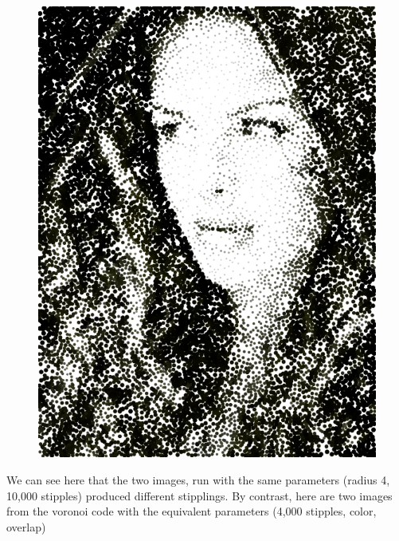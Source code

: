 \documentclass[11pt]{article}
\begin{document}
\begin{figure}[H]
\includegraphics[scale=0.4]{fairyeyes-10000-r4-2.png}
\end{figure}

We can see here that the two images, run with the same parameters (radius 4, 10,000 stipples) produced different stipplings. By contrast, here are two images from the voronoi code with the equivalent parameters (4,000 stipples, color, overlap)
\end{document}

